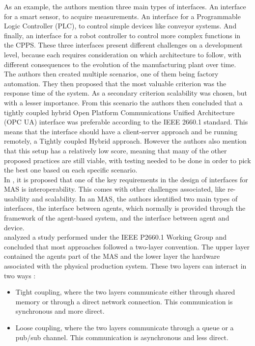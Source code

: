 As an example, the authors mention three main types of interfaces. An interface for a smart sensor, to acquire measurements. An interface for a Programmable Logic Controller (PLC), to control simple devices like conveyor systems. And finally, an interface for a robot controller to control more complex functions in the CPPS. These three interfaces present different challenges on a development level, because each requires consideration on which architecture to follow, with different consequences to the evolution of the manufacturing plant over time.\\

The authors then created multiple scenarios, one of them being factory automation. They then proposed that the most valuable criterion was the response time of the system. As a secondary criterion scalability was chosen, but with a lesser importance. From this scenario the authors then concluded that a tightly coupled hybrid Open Platform Communications Unified Architecture (OPC UA) interface was preferable according to the IEEE 2660.1 standard. This means that the interface should have a client-server approach and be running remotely, a Tightly coupled Hybrid approach. However the authors also mention that this setup has a relatively low score, meaning that many of the other proposed practices are still viable, with testing needed to be done in order to pick the best one based on each specific scenario.\\


In \cite{Karnouskos2019}, it is proposed that one of the key requirements in the design of interfaces for MAS is interoperability. This comes with other challenges associated, like re-usability and scalability. In an MAS, the authors identified two main types of interfaces, the interface between agents, which normally is provided through the framework of the agent-based system, and the interface between agent and device. \\


\citeauthor{8591641} \cite{8591641} analyzed a study performed under the IEEE P2660.1 Working Group \cite{9340089} and concluded that most approaches followed a two-layer convention. The upper layer contained the agents part of the MAS and the lower layer the hardware associated with the physical production system. These two layers can interact in two ways \cite{8591641}:
\begin{itemize}
	\item Tight coupling, where the two layers communicate either through shared memory or through a direct network connection. This communication is synchronous and more direct.
	\item Loose coupling, where the two layers communicate through a queue or a pub/sub channel. This communication is asynchronous and less direct.
\end{itemize}

